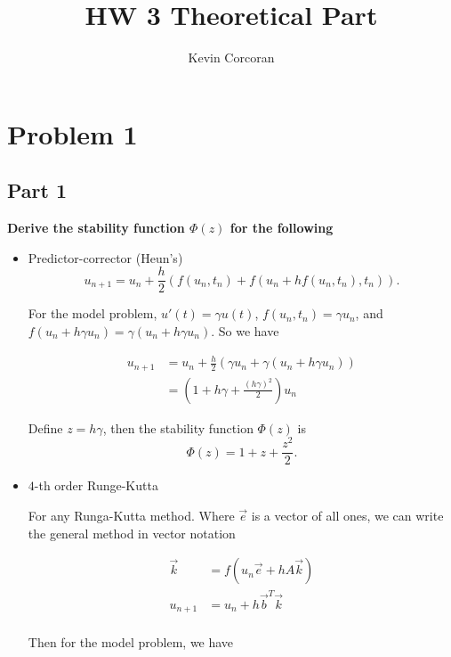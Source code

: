 \documentclass{article}
\title{HW 3 Theoretical Part}
\author{Kevin Corcoran}
\begin{document}
\maketitle

\section{Problem 1}%
\label{sec:problem_1}

\subsection{Part 1}%
\label{sub:part_1}

\par \textbf{Derive the stability function $\Phi (z)$ for the following} 


\begin{itemize}
  \item Predictor-corrector (Heun's)
    \[
      u_{n+1} = u_n + \frac{h}{2} \left(f(u_n,t_n) + f(u_n+hf(u_n,t_n),t_n)\right)
    .\] 

    \par For the model problem, $u'(t) = \gamma u(t)$, $f(u_n,t_n) = \gamma
    u_n$, and $f(u_n + h\gamma u_n)=\gamma(u_n+h\gamma u_n)$. So we have

    \begin{align*}
      u_{n+1} &= u_n + \frac{h}{2} \left(\gamma u_n + \gamma (u_n + h\gamma
      u_n) \right) \\
              &= \left(1 + h\gamma + \frac{(h\gamma)^2}{2}\right) u_n
    \end{align*}

    \par Define $z = h\gamma$, then the stability function $\Phi (z)$ is
    \[
      \boxed{\Phi (z) = 1 + z + \frac{z^2}{2}}
    .\] 

  \item $4$-th order Runge-Kutta

    \par For any Runga-Kutta method. Where $\vec{e}$ is a vector of all
    ones, we can write the general method in vector notation

    \begin{align*}
      \vec{k} &= f(u_n \vec{e} + hA\vec{k}) \\
      u_{n+1} &= u_{n} + h\vec{b}^T\vec{k} \\
    \end{align*}

    \par Then for the model problem, we have
    

\end{itemize}
\end{document}
